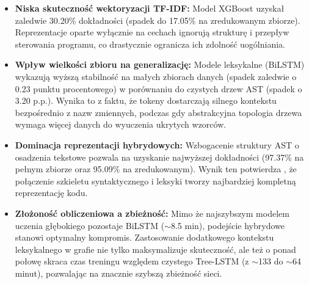 \documentclass[conference]{IEEEtran}
\begin{document}
\begin{itemize}
    \item \textbf{Niska skuteczność wektoryzacji TF-IDF:} Model XGBoost uzyskał zaledwie 30.20\% dokładności (spadek do 17.05\% na zredukowanym zbiorze). 
    Reprezentacje oparte wyłącznie na cechach ignorują strukturę i przepływ sterowania programu, co drastycznie ogranicza ich zdolność uogólniania.
    
    \item \textbf{Wpływ wielkości zbioru na generalizację:} Modele leksykalne (BiLSTM) wykazują wyższą stabilność na małych zbiorach danych (spadek 
    zaledwie o 0.23 punktu procentowego) w porównaniu do czystych drzew AST (spadek o 3.20 p.p.). Wynika to z faktu, że tokeny dostarczają 
    silnego kontekstu bezpośrednio z nazw zmiennych, podczas gdy abstrakcyjna topologia drzewa wymaga więcej danych do wyuczenia ukrytych wzorców.
    
    \item \textbf{Dominacja reprezentacji hybrydowych:} Wzbogacenie struktury AST o osadzenia tekstowe pozwala na uzyskanie najwyższej 
    dokładności (97.37\% na pełnym zbiorze oraz 95.09\% na zredukowanym). Wynik ten potwierdza \cite{b3}, że połączenie szkieletu 
    syntaktycznego i leksyki tworzy najbardziej kompletną reprezentację kodu.
    
    \item \textbf{Złożoność obliczeniowa a zbieżność:} Mimo że najszybszym modelem uczenia głębokiego pozostaje BiLSTM ($\sim$8.5 min), 
    podejście hybrydowe stanowi optymalny kompromis. Zastosowanie dodatkowego kontekstu leksykalnego w grafie nie tylko maksymalizuje 
    skuteczność, ale też o ponad połowę skraca czas treningu względem czystego Tree-LSTM (z $\sim$133 do $\sim$64 minut), pozwalając 
    na znacznie szybszą zbieżność sieci.
\end{itemize}
\end{document}
